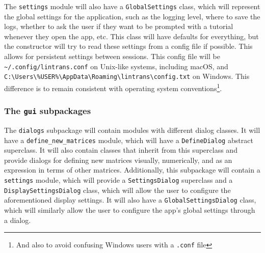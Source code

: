 \documentclass[../main.tex]{subfiles}
\begin{document}
The \texttt{settings} module will also have a \texttt{GlobalSettings} class, which will represent the global settings for the application, such as the logging level, where to save the logs, whether to ask the user if they want to be prompted with a tutorial whenever they open the app, etc. This class will have defaults for everything, but the constructor will try to read these settings from a config file if possible. This allows for persistent settings between sessions. This config file will be \texttt{\textasciitilde/.config/lintrans.conf} on Unix-like systems, including macOS, and \texttt{C:{\textbackslash}Users{\textbackslash}\%USER\%{\textbackslash}AppData{\textbackslash}Roaming{\textbackslash}lintrans{\textbackslash}config.txt} on Windows. This difference is to remain consistent with operating system conventions\footnote{And also to avoid confusing Windows users with a \texttt{.conf} file}.

\subsubsection{The \texttt{gui} subpackages\label{subsubsection:the-gui-subpackages}}

\begin{center}
\end{center}

The \texttt{dialogs} subpackage will contain modules with different dialog classes. It will have a \texttt{define\_new\_matrices} module, which will have a \texttt{DefineDialog} abstract superclass. It will also contain classes that inherit from this superclass and provide dialogs for defining new matrices visually, numerically, and as an expression in terms of other matrices. Additionally, this subpackage will contain a \texttt{settings} module, which will provide a \texttt{SettingsDialog} superclass and a \texttt{DisplaySettingsDialog} class, which will allow the user to configure the aforementioned display settings. It will also have a \texttt{GlobalSettingsDialog} class, which will similarly allow the user to configure the app's global settings through a dialog.
\end{document}
